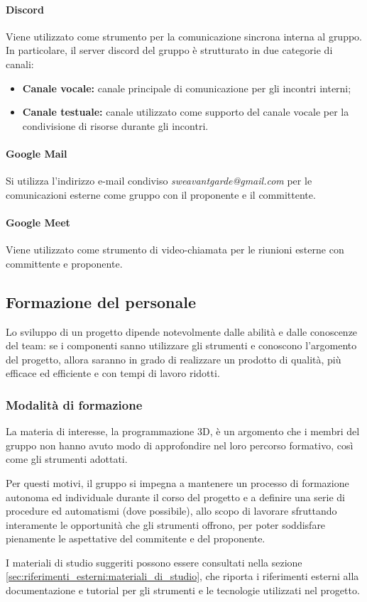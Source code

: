 \paragraph{Discord}
Viene utilizzato come strumento per la comunicazione sincrona interna al gruppo. In particolare, il server discord del gruppo è strutturato in due categorie di canali:
\begin{itemize}
    \item \textbf{Canale vocale:} canale principale di comunicazione per gli incontri interni;
    \item \textbf{Canale testuale:} canale utilizzato come supporto del canale vocale per la condivisione di risorse durante gli incontri.
\end{itemize}

\paragraph{Google Mail}
Si utilizza l’indirizzo e-mail condiviso \textit{sweavantgarde@gmail.com} per le comunicazioni esterne come gruppo con il proponente e il committente.

\paragraph{Google Meet}
Viene utilizzato come strumento di video-chiamata per le riunioni esterne con committente e proponente.

\subsection{Formazione del personale}\label{sec:processi_organizzativi:formazione_personale}
Lo sviluppo di un progetto dipende notevolmente dalle abilità e dalle conoscenze del team: se i componenti sanno utilizzare gli strumenti e conoscono l'argomento del progetto, allora saranno in grado di realizzare un prodotto di qualità, più efficace ed efficiente e con tempi di lavoro ridotti.
\subsubsection{Modalità di formazione}
La materia di interesse, la programmazione 3D, è un argomento che i membri del gruppo non hanno avuto modo di approfondire nel loro percorso formativo, così come gli strumenti adottati.
\par Per questi motivi, il gruppo si impegna a mantenere un processo di formazione autonoma ed individuale durante il corso del progetto e a definire una serie di procedure ed automatismi (dove possibile), allo scopo di lavorare sfruttando interamente le opportunità che gli strumenti offrono, per poter soddisfare pienamente le aspettative del commitente e del proponente.
\par I materiali di studio suggeriti possono essere consultati nella sezione \ref{sec:riferimenti_esterni:materiali_di_studio}, che riporta i riferimenti esterni alla documentazione e tutorial per gli strumenti e le tecnologie utilizzati nel progetto.

